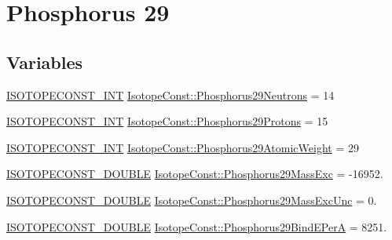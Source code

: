 \hypertarget{group___isotope_const-_phosphorus-_p29}{}\section{Phosphorus 29}
\label{group___isotope_const-_phosphorus-_p29}
\subsection*{Variables}
\begin{DoxyCompactItemize}
\item 
\mbox{\hyperlink{group___isotope_const-_macros_ga5f18360b3e99483a35c32d789e62621c}{I\+S\+O\+T\+O\+P\+E\+C\+O\+N\+S\+T\+\_\+\+I\+NT}} \mbox{\hyperlink{group___isotope_const-_phosphorus-_p29_ga28252ff9dd76625a47d9bfb2293c9c9d}{Isotope\+Const\+::\+Phosphorus29\+Neutrons}} = 14
\item 
\mbox{\hyperlink{group___isotope_const-_macros_ga5f18360b3e99483a35c32d789e62621c}{I\+S\+O\+T\+O\+P\+E\+C\+O\+N\+S\+T\+\_\+\+I\+NT}} \mbox{\hyperlink{group___isotope_const-_phosphorus-_p29_ga3be787ab95489af7f5918413d2f99743}{Isotope\+Const\+::\+Phosphorus29\+Protons}} = 15
\item 
\mbox{\hyperlink{group___isotope_const-_macros_ga5f18360b3e99483a35c32d789e62621c}{I\+S\+O\+T\+O\+P\+E\+C\+O\+N\+S\+T\+\_\+\+I\+NT}} \mbox{\hyperlink{group___isotope_const-_phosphorus-_p29_gacc714ac592518749ee72526d0023b2fa}{Isotope\+Const\+::\+Phosphorus29\+Atomic\+Weight}} = 29
\item 
\mbox{\hyperlink{group___isotope_const-_macros_ga8f45a7272ce02c0b4c65c44636ed719a}{I\+S\+O\+T\+O\+P\+E\+C\+O\+N\+S\+T\+\_\+\+D\+O\+U\+B\+LE}} \mbox{\hyperlink{group___isotope_const-_phosphorus-_p29_ga3fcd3f9bde86e646c0f1c2da8534bccd}{Isotope\+Const\+::\+Phosphorus29\+Mass\+Exc}} = -\/16952.
\item 
\mbox{\hyperlink{group___isotope_const-_macros_ga8f45a7272ce02c0b4c65c44636ed719a}{I\+S\+O\+T\+O\+P\+E\+C\+O\+N\+S\+T\+\_\+\+D\+O\+U\+B\+LE}} \mbox{\hyperlink{group___isotope_const-_phosphorus-_p29_ga6a90af78642a08671e62d9652d54c5b7}{Isotope\+Const\+::\+Phosphorus29\+Mass\+Exc\+Unc}} = 0.
\item 
\mbox{\hyperlink{group___isotope_const-_macros_ga8f45a7272ce02c0b4c65c44636ed719a}{I\+S\+O\+T\+O\+P\+E\+C\+O\+N\+S\+T\+\_\+\+D\+O\+U\+B\+LE}} \mbox{\hyperlink{group___isotope_const-_phosphorus-_p29_ga1c83bed3ae32802357f43a127e6a1dcb}{Isotope\+Const\+::\+Phosphorus29\+Bind\+E\+PerA}} = 8251.
\item 

\end{DoxyCompactItemize}
